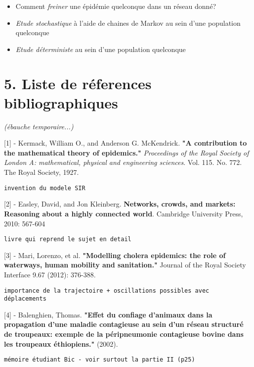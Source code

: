 \documentclass{article}
\begin{document}
\begin{itemize}
\item  Comment \textit{freiner} une épidémie quelconque dans un réseau donné?
\item  \textit{Etude stochastique} à l'aide de chaines de Markov au sein d'une population quelconque
\item  \textit{Etude déterministe} au sein d'une population quelconque

\end{itemize}

\section{5. Liste de réferences bibliographiques}

\textit{(ébauche temporaire...)}

[1] -  Kermack, William O., and Anderson G. McKendrick. \textbf{"A contribution to the mathematical theory of epidemics."} \textit{Proceedings of the Royal Society of London A: mathematical, physical and engineering sciences}. Vol. 115. No. 772. The Royal Society, 1927.


\begin{verbatim}
invention du modele SIR
\end{verbatim}


[2] -  Easley, David, and Jon Kleinberg. \textbf{Networks, crowds, and markets: Reasoning about a highly connected world}. Cambridge University Press, 2010: 567-604


\begin{verbatim}
livre qui reprend le sujet en detail
\end{verbatim}


[3] - Mari, Lorenzo, et al. \textbf{"Modelling cholera epidemics: the role of waterways, human mobility and sanitation."} Journal of the Royal Society Interface 9.67 (2012): 376-388.


\begin{verbatim}
importance de la trajectoire + oscillations possibles avec déplacements
\end{verbatim}


[4] - Balenghien, Thomas. \textbf{"Effet du confiage d'animaux dans la propagation d'une maladie contagieuse au sein d'un réseau structuré de troupeaux: exemple de la péripneumonie contagieuse bovine dans les troupeaux éthiopiens."} (2002).


\begin{verbatim}
mémoire étudiant Bic - voir surtout la partie II (p25)
\end{verbatim}
\end{document}
